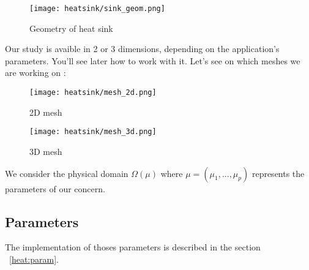 \begin{figure}[!h]
\centering
\texttt{[image: heatsink/sink\_geom.png]}
\caption{Geometry of heat sink}
\end{figure}

Our study is avaible in 2 or 3 dimensions, depending on the application's parameters. You'll see later how to work with it. Let's see on which meshes we are working on :
\begin{figure}[!h]
\begin{minipage}[b]{.50\linewidth}
\centering
\texttt{[image: heatsink/mesh\_2d.png]}
\caption{2D mesh}
\end{minipage}
\begin{minipage}[b]{.50\linewidth}
\centering
\texttt{[image: heatsink/mesh\_3d.png]}
\caption{3D mesh}
\end{minipage}
\end{figure}

We consider the physical domain $\varOmega (\mu)$ where $\mu = (\mu_1, ...,\mu_p)$ represents the parameters of our concern. 

\subsection{Parameters}
The implementation of thoses parameters is described in the section ~\ref{heat:param}.


